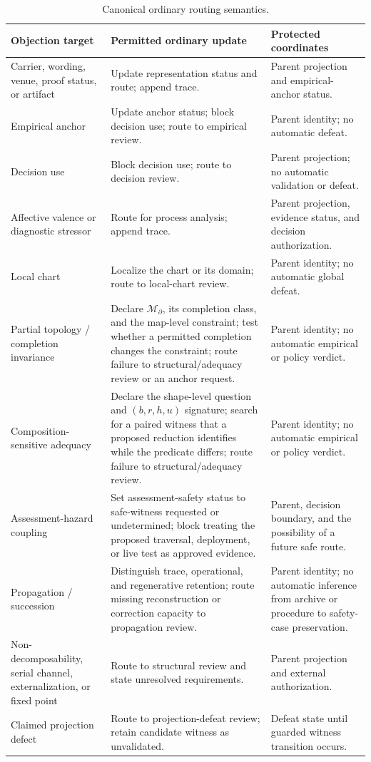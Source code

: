 \documentclass[10pt]{article}
\begin{document}
\begin{table}[htbp]
\centering
\caption{Canonical ordinary routing semantics.}
\label{tab:routing}
\small
\begin{tabularx}{\textwidth}{>{\raggedright\arraybackslash}p{}p{}X}
\toprule
Objection target & Permitted ordinary update & Protected coordinates \\
\midrule
Carrier, wording, venue, proof status, or artifact & Update representation status and route; append trace. & Parent projection and empirical-anchor status. \\
Empirical anchor & Update anchor status; block decision use; route to empirical review. & Parent identity; no automatic defeat. \\
Decision use & Block decision use; route to decision review. & Parent projection; no automatic validation or defeat. \\
Affective valence or diagnostic stressor & Route for process analysis; append trace. & Parent projection, evidence status, and decision authorization. \\
Local chart & Localize the chart or its domain; route to local-chart review. & Parent identity; no automatic global defeat. \\
Partial topology / completion invariance & Declare $\mathcal{M}_{\partial}$, its completion class, and the map-level constraint; test whether a permitted completion changes the constraint; route failure to structural/adequacy review or an anchor request. & Parent identity; no automatic empirical or policy verdict. \\
Composition-sensitive adequacy & Declare the shape-level question and $(b,r,h,u)$ signature; search for a paired witness that a proposed reduction identifies while the predicate differs; route failure to structural/adequacy review. & Parent identity; no automatic empirical or policy verdict. \\
Assessment-hazard coupling & Set assessment-safety status to safe-witness requested or undetermined; block treating the proposed traversal, deployment, or live test as approved evidence. & Parent, decision boundary, and the possibility of a future safe route. \\
Propagation / succession & Distinguish trace, operational, and regenerative retention; route missing reconstruction or correction capacity to propagation review. & Parent identity; no automatic inference from archive or procedure to safety-case preservation. \\
Non-decomposability, serial channel, externalization, or fixed point & Route to structural review and state unresolved requirements. & Parent projection and external authorization. \\
Claimed projection defect & Route to projection-defeat review; retain candidate witness as unvalidated. & Defeat state until guarded witness transition occurs. \\
\bottomrule
\end{tabularx}
\end{table}
\end{document}
